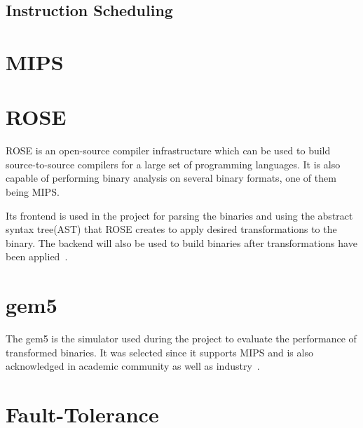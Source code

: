 \subsection{Instruction Scheduling}


\section{MIPS}

\section{ROSE}
ROSE is an open-source compiler infrastructure which can be used to build
source-to-source compilers for a large set of programming languages.
It is also capable of performing binary analysis on several
binary formats, one of them being MIPS.
%

Its frontend is used in the project for parsing the binaries and using
the abstract syntax tree(AST) that ROSE creates to apply desired
transformations to the binary. The backend will also be used to build
binaries after transformations have been applied~\cite{rose}.

\section{gem5}
The gem5 is the simulator used during the project to evaluate the performance
of transformed binaries. It was selected since it supports MIPS and
is also acknowledged in academic community as well as industry~\cite{gem5}.

\section{Fault-Tolerance}

